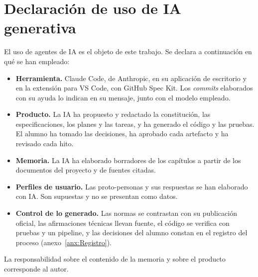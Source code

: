 \chapter{Declaración de uso de IA generativa}\label{anx:DeclaracionIA}

El uso de agentes de IA es el objeto de este trabajo. Se declara a continuación en qué se han empleado:

\begin{itemize}
	\item \textbf{Herramienta.} Claude Code, de Anthropic, en su aplicación de escritorio y en la extensión para VS Code, con GitHub Spec Kit. Los \emph{commits} elaborados con su ayuda lo indican en su mensaje, junto con el modelo empleado.
	\item \textbf{Producto.} La IA ha propuesto y redactado la constitución, las especificaciones, los planes y las tareas, y ha generado el código y las pruebas. El alumno ha tomado las decisiones, ha aprobado cada artefacto y ha revisado cada hito.
	\item \textbf{Memoria.} La IA ha elaborado borradores de los capítulos a partir de los documentos del proyecto y de fuentes citadas. 
	\item \textbf{Perfiles de usuario.} Las proto-personas y sus respuestas se han elaborado con IA. Son supuestas y no se presentan como datos.
	\item \textbf{Control de lo generado.} Las normas se contrastan con su publicación oficial, las afirmaciones técnicas llevan fuente, el código se verifica con pruebas y un pipeline, y las decisiones del alumno constan en el registro del proceso (anexo~\ref{anx:Registro}).
\end{itemize}

La responsabilidad sobre el contenido de la memoria y sobre el producto corresponde al autor.
